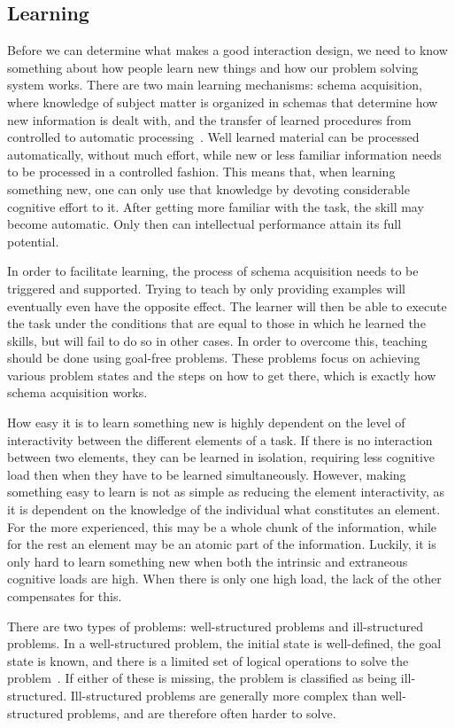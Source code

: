 \subsection{Learning}
Before we can determine what makes a good interaction design, we need to know something about how people learn new things and how our problem solving system works. There are two main learning mechanisms: schema acquisition, where knowledge of subject matter is organized in schemas that determine how new information is dealt with, and the transfer of learned procedures from controlled to automatic processing~\cite{sweller1994cognitive}. Well learned material can be processed automatically, without much effort, while new or less familiar information needs to be processed in a controlled fashion. This means that, when learning something new, one can only use that knowledge by devoting considerable cognitive effort to it. After getting more familiar with the task, the skill may become automatic. Only then can intellectual performance attain its full potential.

In order to facilitate learning, the process of schema acquisition needs to be triggered and supported. Trying to teach by only providing examples will eventually even have the opposite effect. The learner will then be able to execute the task under the conditions that are equal to those in which he learned the skills, but will fail to do so in other cases. In order to overcome this, teaching should be done using goal-free problems. These problems focus on achieving various problem states and the steps on how to get there, which is exactly how schema acquisition works.

How easy it is to learn something new is highly dependent on the level of interactivity between the different elements of a task. If there is no interaction between two elements, they can be learned in isolation, requiring less cognitive load then when they have to be learned simultaneously. However, making something easy to learn is not as simple as reducing the element interactivity, as it is dependent on the knowledge of the individual what constitutes an element. For the more experienced, this may be a whole chunk of the information, while for the rest an element may be an atomic part of the information. Luckily, it is only hard to learn something new when both the intrinsic and extraneous cognitive loads are high. When there is only one high load, the lack of the other compensates for this.

There are two types of problems: well-structured problems and ill-structured problems. In a well-structured problem, the initial state is well-defined, the goal state is known, and there is a limited set of logical operations to solve the problem~\cite{jonassen2000toward}. If either of these is missing, the problem is classified as being ill-structured. Ill-structured problems are generally more complex than well-structured problems, and are therefore often harder to solve.

